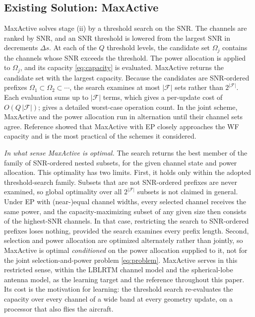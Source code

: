 \documentclass[correspondence]{IEEEtaes}
\begin{document}
\subsection{Existing Solution: MaxActive}
\label{sec:maxactive}
MaxActive \cite{saeed2024maxactive} solves stage (ii) by a threshold search on the SNR. The
channels are ranked by SNR, and an SNR threshold is lowered from the largest SNR in
decrements $\Delta s$. At each of the $Q$ threshold levels, the candidate set
$\Omega_j$ contains the channels whose SNR exceeds the threshold. The power allocation is
applied to $\Omega_j$, and its capacity \eqref{eq:capacity} is evaluated. MaxActive
returns the candidate set with the largest capacity. Because the candidates are
SNR-ordered prefixes $\Omega_1\subset\Omega_2\subset\cdots$, the search examines at most
$|\mathcal{F}|$ sets rather than $2^{|\mathcal{F}|}$. Each evaluation sums up to
$|\mathcal{F}|$ terms, which gives a per-update cost of $O(Q\,|\mathcal{F}|)$;
\cite{saeed2024maxactive} gives a detailed worst-case operation count. In the joint
scheme, MaxActive and the power allocation run in alternation until their channel sets
agree. Reference \cite{saeed2024maxactive} showed that MaxActive with EP closely
approaches the WF capacity and is the most practical of the schemes it considered.

\emph{In what sense MaxActive is optimal.} The search returns the best member of the
family of SNR-ordered nested subsets, for the given channel state and power allocation.
This optimality has two limits. First, it holds only within the adopted threshold-search
family. Subsets that are not SNR-ordered prefixes are never examined, so global
optimality over all $2^{|\mathcal{F}|}$ subsets is not claimed in general. Under EP with
(near-)equal channel widths, every selected channel receives the same power, and the
capacity-maximizing subset of any given size then consists of the highest-SNR channels.
In that case, restricting the search to SNR-ordered prefixes loses nothing, provided the
search examines every prefix length. Second, selection
and power allocation are optimized alternately rather than jointly, so MaxActive is
optimal \emph{conditioned} on the power allocation supplied to it, not for the joint
selection-and-power problem \eqref{eq:problem}. MaxActive serves in this restricted
sense, within the LBLRTM channel model and the spherical-lobe antenna model, as the
learning target and the reference throughout this paper. Its cost is the motivation for
learning: the threshold search re-evaluates the capacity over every channel of a wide band
at every geometry update, on a processor that also flies the aircraft.
\end{document}
